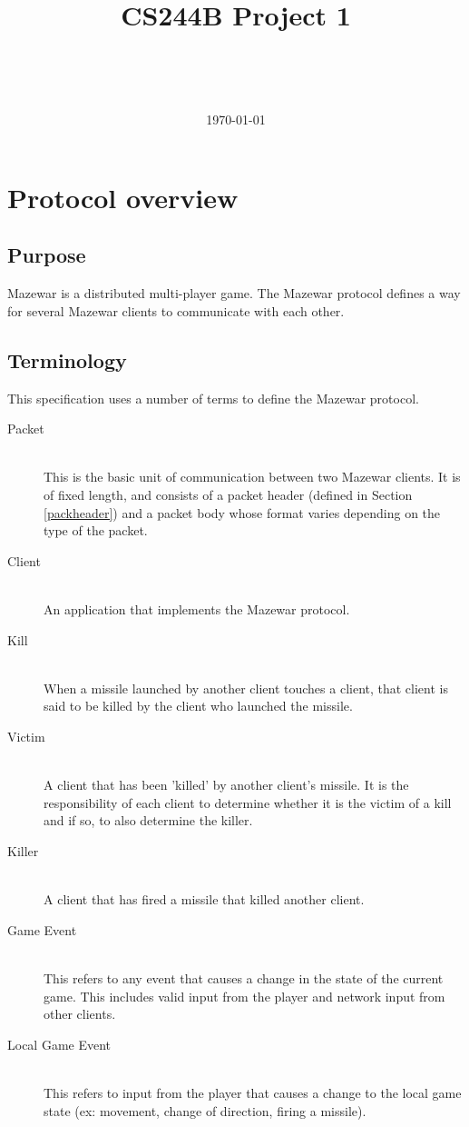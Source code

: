 \documentclass[11pt]{article} %
\author{\myname \\
		\texttt{\myemail}
		\and
		\partnername \\
		\texttt{\partneremail}
}
\begin{document}
\title{CS244B Project 1}
\date{\today}
\maketitle

\tableofcontents

\section{Protocol overview}

\subsection{Purpose}
Mazewar is a distributed multi-player game. The Mazewar protocol defines a way
for several Mazewar clients to communicate with each other.

\subsection{Terminology}
This specification uses a number of terms to define the Mazewar protocol.

\begin{description}
	\item[Packet] \hfill \\
		This is the basic unit of communication between two Mazewar clients. It
		is of fixed length, and consists of a packet header (defined in 
		Section \ref{packheader}) and a packet body whose format varies
		depending on the type of the packet.
	\item[Client] \hfill \\
		An application that implements the Mazewar protocol.
	\item[Kill] \hfill \\
		When a missile launched by another client touches a client, that
		client is said to be killed by the client who launched the missile.
	\item[Victim] \hfill \\
		A client that has been 'killed' by another client's missile. It is the
		responsibility of each client to determine whether it is the victim of a
		kill and if so, to also determine the killer.
	\item[Killer] \hfill \\
		A client that has fired a missile that killed another client.
	\item[Game Event] \hfill \\
		This refers to any event that causes a change in the state of the
		current game. This includes valid input from the player and network
		input from other clients.
	\item[Local Game Event] \hfill \\
		This refers to input from the player that causes a change to the local
		game state (ex: movement, change of direction, firing a missile).
\end{description}
\end{document}
